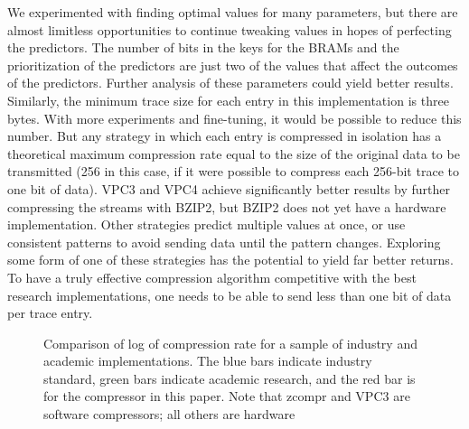 \documentclass[conference]{IEEEtran}
\begin{document}
We experimented with finding optimal values for many parameters, but there are almost limitless opportunities to continue tweaking values in hopes of perfecting the predictors. The number of bits in the keys for the BRAMs and the prioritization of the predictors are just two of the values that affect the outcomes of the predictors. Further analysis of these parameters could yield better results. Similarly, the minimum trace size for each entry in this implementation is three bytes. With more experiments and fine-tuning, it would be possible to reduce this number. But any strategy in which each entry is compressed in isolation has a theoretical maximum compression rate equal to the size of the original data to be transmitted (256 in this case, if it were possible to compress each 256-bit trace to one bit of data). VPC3 and VPC4 achieve significantly better results by further compressing the streams with BZIP2, but BZIP2 does not yet have a hardware implementation. Other strategies predict multiple values at once, or use consistent patterns to avoid sending data until the pattern changes. Exploring some form of one of these strategies has the potential to yield far better returns. To have a truly effective compression algorithm competitive with the best research implementations, one needs to be able to send less than one bit of data per trace entry.

 \begin{figure}
 \label{comparison}
 \caption{Comparison of log of compression rate for a sample of industry and academic implementations. The blue bars indicate industry standard, green bars indicate academic research, and the red bar is for the compressor in this paper. Note that zcompr and VPC3 are software compressors; all others are hardware}

 \end{figure}
  
\end{document}
